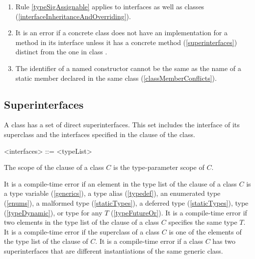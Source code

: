 \documentclass[makeidx]{article}
\begin{document}
{\begin{enumerate}
  If multiple superinterfaces of an interface
  define a member with the same name $m$,
  then at most one member is inherited.
  That member (if it exists) is the one whose type is a subtype
  of all the others.
  If there is no such member, then an error occurs
  (\ref{interfaceInheritanceAndOverriding}).
\item Rule \ref{typeSigAssignable} applies to interfaces as well as classes
  (\ref{interfaceInheritanceAndOverriding}).
\item It is an error if a concrete class does not have an implementation
  for a method in its interface
  unless it has a concrete  method
  (\ref{superinterfaces})
  distinct from the one in class .
\item The identifier of a named constructor cannot be
  the same as the name of a static member declared in the same class
  (\ref{classMemberConflicts}).
\end{enumerate}
}


\subsection{Superinterfaces}

\LMHash{}%
A class has a set of direct superinterfaces.
This set includes the interface of its superclass and the interfaces specified in the \IMPLEMENTS{} clause of the class.

\begin{grammar}
<interfaces> ::= \IMPLEMENTS{} <typeList>
\end{grammar}

\LMHash{}%
The scope of the \IMPLEMENTS{} clause of a class $C$ is the type-parameter scope of $C$.

\LMHash{}%
It is a compile-time error if an element in the type list of the \IMPLEMENTS{} clause of a class $C$ is
a type variable (\ref{generics}), a type alias (\ref{typedef}),
an enumerated type (\ref{enums}), a malformed type (\ref{staticTypes}),
a deferred type (\ref{staticTypes}), type \DYNAMIC{} (\ref{typeDynamic}),
or type  for any $T$ (\ref{typeFutureOr}).
It is a compile-time error if two elements in the type list of the \IMPLEMENTS{} clause of a class $C$ specifies the same type $T$.
It is a compile-time error if the superclass of a class $C$ is one of the elements of the type list of the \IMPLEMENTS{} clause of $C$.
It is a compile-time error if a class $C$ has two superinterfaces that are different instantiations of the same generic class.
\end{document}
